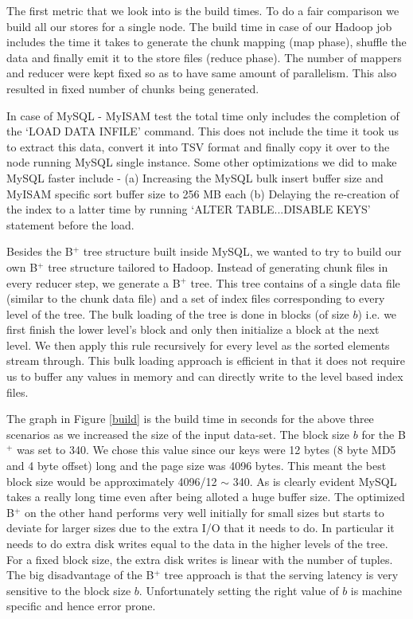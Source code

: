 \documentclass[twocolumn]{article}
\begin{document}
The first metric that we look into is the build times. To do a fair comparison we build all our stores for a single node. The build time in case of our Hadoop job includes the time it takes to generate the chunk mapping (map phase), shuffle the data and finally emit it to the store files (reduce phase). The number of mappers and reducer were kept fixed so as to have same amount of parallelism. This also resulted in fixed number of chunks being generated.

In case of MySQL - MyISAM test the total time only includes the completion of the `LOAD DATA INFILE' command. This does not include the time it took us to extract this data, convert it into TSV format and finally copy it over to the node running MySQL single instance. Some other optimizations we did to make MySQL faster include - (a) Increasing the MySQL bulk insert buffer size and MyISAM specific sort buffer size to 256 MB each (b) Delaying the re-creation of the index to a latter time by running `ALTER TABLE...DISABLE KEYS' statement before the load. 

Besides the B$^{+}$ tree structure built inside MySQL, we wanted to try to build our own B$^{+}$ tree structure tailored to Hadoop. Instead of generating chunk files in every reducer step, we generate a B$^{+}$ tree. This tree contains of a single data file (similar to the chunk data file) and a set of index files corresponding to every level of the tree. The bulk loading of the tree is done in blocks (of size $b$) i.e. we first finish the lower level's block and only then initialize a block at the next level. We then apply this rule recursively for every level as the sorted elements stream through. This bulk loading approach is efficient in that it does not require us to buffer any values in memory and can directly write to the level based index files. 

The graph in Figure \ref{build} is the build time in seconds for the above three scenarios as we increased the size of the input data-set. The block size $b$ for the B$^{+}$ was set to 340. We chose this value since our keys were 12 bytes (8 byte MD5 and 4 byte offset) long and the page size was 4096 bytes. This meant the best block size would be approximately 4096/12 $\sim$ 340. As is clearly evident MySQL takes a really long time even after being alloted a huge buffer size. The optimized B$^{+}$ on the other hand performs very well initially for small sizes but starts to deviate for larger sizes due to the extra I/O that it needs to do. In particular it needs to do extra disk writes equal to the data in the higher levels of the tree. For a fixed block size, the extra disk writes is linear with the number of tuples. The big disadvantage of the B$^{+}$ tree approach is that the serving latency is very sensitive to the block size $b$. Unfortunately setting the right value of $b$ is machine specific and hence error prone. 
\end{document}
